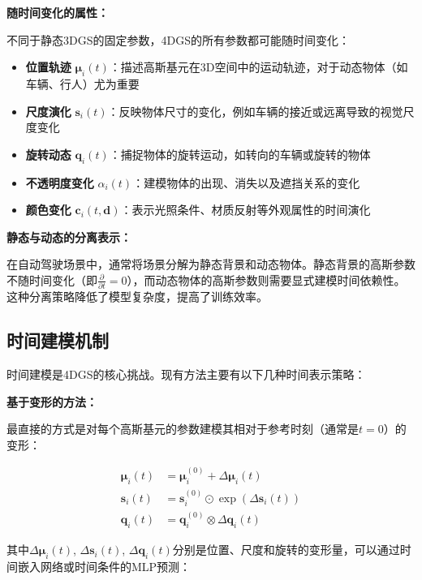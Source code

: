 \textbf{随时间变化的属性：}

不同于静态3DGS的固定参数，4DGS的所有参数都可能随时间变化：

\begin{itemize}
\item \textbf{位置轨迹} $\boldsymbol{\mu}_i(t)$：描述高斯基元在3D空间中的运动轨迹，对于动态物体（如车辆、行人）尤为重要
\item \textbf{尺度演化} $\mathbf{s}_i(t)$：反映物体尺寸的变化，例如车辆的接近或远离导致的视觉尺度变化
\item \textbf{旋转动态} $\mathbf{q}_i(t)$：捕捉物体的旋转运动，如转向的车辆或旋转的物体
\item \textbf{不透明度变化} $\alpha_i(t)$：建模物体的出现、消失以及遮挡关系的变化
\item \textbf{颜色变化} $\mathbf{c}_i(t, \mathbf{d})$：表示光照条件、材质反射等外观属性的时间演化
\end{itemize}

\textbf{静态与动态的分离表示：}

在自动驾驶场景中，通常将场景分解为静态背景和动态物体。静态背景的高斯参数不随时间变化（即$\frac{\partial}{\partial t} = 0$），而动态物体的高斯参数则需要显式建模时间依赖性。这种分离策略降低了模型复杂度，提高了训练效率。

\subsection{时间建模机制}

时间建模是4DGS的核心挑战。现有方法主要有以下几种时间表示策略：

\textbf{基于变形的方法：}

最直接的方式是对每个高斯基元的参数建模其相对于参考时刻（通常是$t=0$）的变形：

\begin{align}
\boldsymbol{\mu}_i(t) &= \boldsymbol{\mu}_i^{(0)} + \Delta\boldsymbol{\mu}_i(t) \label{eq:deformation_position} \\
\mathbf{s}_i(t) &= \mathbf{s}_i^{(0)} \odot \exp(\Delta\mathbf{s}_i(t)) \label{eq:deformation_scale} \\
\mathbf{q}_i(t) &= \mathbf{q}_i^{(0)} \otimes \Delta\mathbf{q}_i(t) \label{eq:deformation_rotation}
\end{align}

其中$\Delta\boldsymbol{\mu}_i(t)$, $\Delta\mathbf{s}_i(t)$, $\Delta\mathbf{q}_i(t)$分别是位置、尺度和旋转的变形量，可以通过时间嵌入网络或时间条件的MLP预测：

